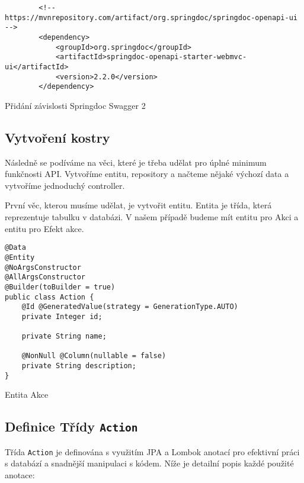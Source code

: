 \begin{listing}[H]
    \begin{verbatim}
        <!-- https://mvnrepository.com/artifact/org.springdoc/springdoc-openapi-ui -->
        <dependency>
            <groupId>org.springdoc</groupId>
            <artifactId>springdoc-openapi-starter-webmvc-ui</artifactId>
            <version>2.2.0</version>
        </dependency>
    \end{verbatim}
    \caption{Přidání závislosti Springdoc Swagger 2}
    \label{code:swagger-dependency}
\end{listing}


\subsection{Vytvoření kostry}
Následně se podíváme na věci, které je třeba udělat pro úplné minimum funkčnosti API. Vytvoříme entitu, repository a načteme nějaké výchozí data a vytvoříme jednoduchý controller.

První věc, kterou musíme udělat, je vytvořit entitu. Entita je třída, která reprezentuje tabulku v databázi. V našem případě budeme mít entitu pro Akci a entitu pro Efekt akce.

\begin{listing}[H]
    \begin{verbatim}
@Data
@Entity
@NoArgsConstructor
@AllArgsConstructor
@Builder(toBuilder = true)
public class Action {
    @Id @GeneratedValue(strategy = GenerationType.AUTO)
    private Integer id;

    private String name;

    @NonNull @Column(nullable = false)
    private String description;
}
    \end{verbatim}
    \caption{Entita Akce}
    \label{code:action-entity}
\end{listing}

\subsection*{Definice Třídy \texttt{Action}}

Třída \texttt{Action} je definována s využitím JPA a Lombok anotací pro efektivní práci s databází a snadnější manipulaci s kódem. Níže je detailní popis každé použité anotace:

